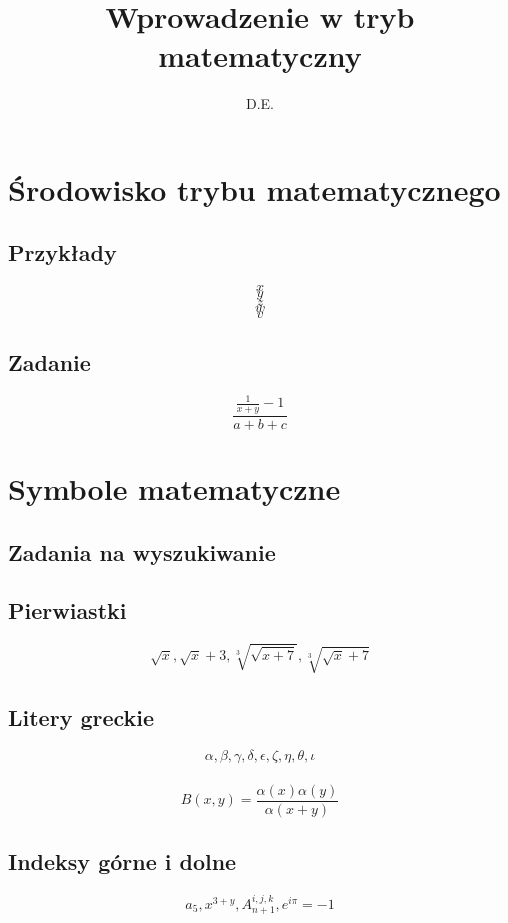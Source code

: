\documentclass[a4paper, 12pt]{amsart}
\author{D.E.}
\title{Wprowadzenie w tryb matematyczny}
\begin{document}
\maketitle
\section{Środowisko trybu matematycznego}
\subsection{Przykłady}
$$x$$
\[y\]
\begin{displaymath} z \end{displaymath}
\begin{equation} w \end{equation}
\begin{equation*} v \end{equation*}
\subsection{Zadanie}
\begin{equation}
\frac{\frac{1}{x+y}-1}{a+b+c}
\end{equation}
\section{Symbole matematyczne}
\subsection{Zadania na wyszukiwanie}
\subsection{Pierwiastki}
\begin{displaymath}
\sqrt{x}, \sqrt{x}+3, \sqrt[3]{\sqrt{x+7}}, \sqrt[3]{\sqrt{x}+7}
\end{displaymath}
\subsection{Litery greckie}
\begin{displaymath}
\alpha, \beta, \gamma, \delta, \epsilon, \zeta, \eta, \theta, \iota
\end{displaymath} \\
\begin{displaymath}
B(x,y) = \frac{\alpha(x)\alpha(y)}{\alpha(x+y)}
\end{displaymath}
\subsection{Indeksy górne i dolne}
\begin{displaymath}
a_{5}, x^{3+y}, A^{i,j,k}_{n+1}, e^{i\pi} = -1
\end{displaymath}
\end{document}
